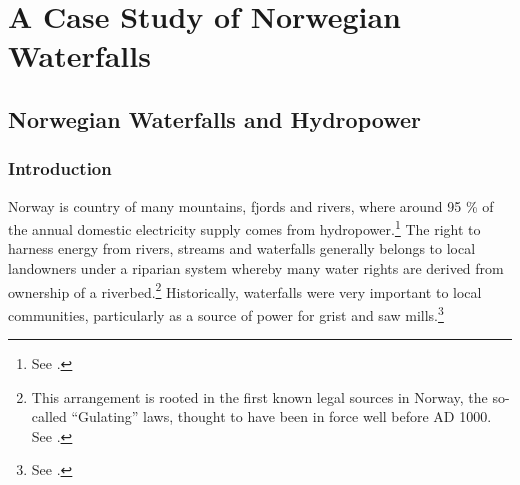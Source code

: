 \part{A Case Study of Norwegian Waterfalls}

\chapter{Norwegian Waterfalls and Hydropower}\label{chap:4}

\section{Introduction}\label{sec:4:1}

Norway is country of many mountains, fjords and rivers, where around 95 \% of the annual domestic electricity supply comes from hydropower.\footnote{See \cite{statistikk13}.} The right to harness energy from rivers, streams and waterfalls generally belongs to local landowners under a riparian system whereby many water rights are derived from ownership of a riverbed.\footnote{This arrangement is rooted in the first known legal sources in Norway, the so-called ``Gulating'' laws, thought to have been in force well before AD 1000. See \cite[111-112,120]{robberstad81}.}  Historically, waterfalls were very important to local communities, particularly as a source of power for grist and saw mills.\footnote{See \cite[121]{tvedt13}.} %

